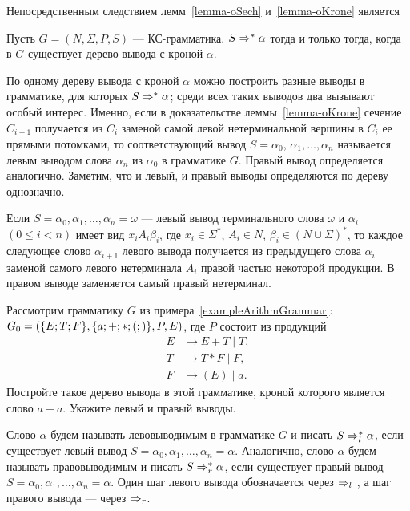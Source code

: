 Непосредственным следствием лемм~\ref{lemma-oSech} и~\ref{lemma-oKrone} является

\begin{mytheorem}
\label{theorem-SechKrona}
Пусть $G=(N,\Sigma,P,S)$ --- КС-грамматика. $S\Rightarrow^*\alpha$ тогда и только тогда, когда в $G$ существует дерево вывода с кроной $\alpha$.
\end{mytheorem}

По одному дереву вывода с кроной $\alpha$ можно построить разные выводы в грамматике, для которых $S\Rightarrow^*\alpha$; среди всех таких выводов два вызывают особый интерес. Именно, если в доказательстве леммы~\ref{lemma-oKrone} сечение $C_{i+1}$ получается из $C_i$ заменой самой левой нетерминальной вершины в $C_i$ ее прямыми потомками, то соответствующий вывод $S=\alpha_0$, $\alpha_1, \ldots , \alpha_n$ называется левым выводом слова $\alpha_n$ из $\alpha_0$ в грамматике $G$. Правый вывод определяется аналогично. Заметим, что и левый, и правый выводы определяются по дереву однозначно.

Если $S=\alpha_0,\alpha_1, \ldots , \alpha_n=\omega$ --- левый вывод терминального слова $\omega$ и $\alpha_i$ $(0\le i<n)$ имеет вид $x_iA_i\beta_i$, где $x_i\in\Sigma^*$, $A_i\in N$, $\beta_i\in(N\cup\Sigma)^*$, то каждое следующее слово $\alpha_{i+1}$ левого вывода получается из предыдущего слова $\alpha_i$ заменой самого левого нетерминала $A_i$ правой частью некоторой продукции. В правом выводе заменяется самый правый нетерминал.

\begin{myproblem}
Рассмотрим грамматику $G$ из примера~\ref{exampleArithmGrammar}: $G_0=(\{E;T;F\},\\\{a;+;*;(;)\},P,E)$, где $P$ состоит из продукций
\begin{align*}
    E &\to E+T \mid T, \\
    T &\to T*F \mid F, \\
    F &\to (E) \mid a.
\end{align*}
Постройте такое дерево вывода в этой грамматике, кроной которого является слово $a+a$. Укажите левый и правый выводы.
\end{myproblem}

Слово $\alpha$ будем называть левовыводимым в грамматике $G$ и писать $S\Rightarrow_l^*\alpha$, если существует левый вывод $S=\alpha_0,\alpha_1, \ldots , \alpha_n=\alpha$. Аналогично, слово $\alpha$ будем называть правовыводимым и писать $S\Rightarrow_r^*\alpha$, если существует правый вывод $S=\alpha_0,\alpha_1, \ldots , \alpha_n=\alpha$. Один шаг левого вывода обозначается через $\Rightarrow_l$ , а шаг правого вывода --- через $\Rightarrow_r$.

